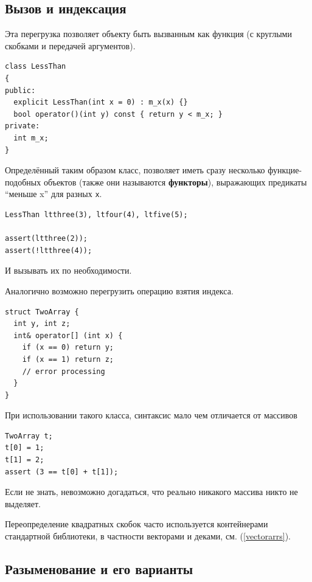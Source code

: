 \documentclass[a4paper,12pt,oneside]{book}
\begin{document}
\subsection{Вызов и индексация}\label{BracketOverloading}

Эта перегрузка позволяет объекту быть вызванным как функция (с круглыми скобками и передачей аргументов).

\begin{lstlisting}
class LessThan
{
public:
  explicit LessThan(int x = 0) : m_x(x) {}
  bool operator()(int y) const { return y < m_x; }
private:
  int m_x;
}
\end{lstlisting}

Определённый таким образом класс, позволяет иметь сразу несколько функцие-подобных объектов (также они называются \textbf{функторы}), выражающих предикаты ``меньше x'' для разных \lstinline!x!.

\begin{lstlisting}
LessThan ltthree(3), ltfour(4), ltfive(5);

assert(ltthree(2));
assert(!ltthree(4));
\end{lstlisting}

И вызывать их по необходимости.

Аналогично возможно перегрузить операцию взятия индекса.

\begin{lstlisting}
struct TwoArray {
  int y, int z;
  int& operator[] (int x) {
    if (x == 0) return y;
    if (x == 1) return z;
    // error processing
  }
}
\end{lstlisting}

При использовании такого класса, синтаксис мало чем отличается от массивов

\begin{lstlisting}
TwoArray t;
t[0] = 1;
t[1] = 2;
assert (3 == t[0] + t[1]);
\end{lstlisting}

Если не знать, невозможно догадаться, что реально никакого массива никто не выделяет.

Переопределение квадратных скобок часто используется контейнерами стандартной библиотеки, в частности векторами и деками, см. (\ref{vectorarrs}).

\subsection{Разыменование и его варианты}\label{DereferenceOverloading}
\end{document}
